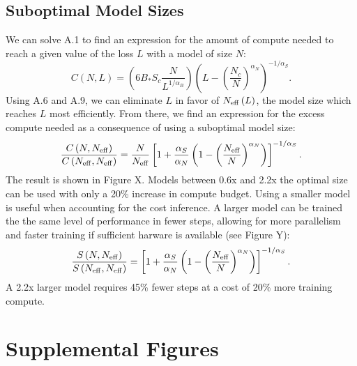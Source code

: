 \documentclass[english]{article}
\newcommand{\be}{\begin{equation}}
\newcommand{\ee}{\end{equation}}
\begin{document}
\subsection{Suboptimal Model Sizes}
\label{sec:suboptimal-models}
We can solve A.1 to find an expression for the amount of compute needed to reach a given value of the loss $L$ with a model of size $N$:
\be
C\left(N,L\right)=\left(6B_{\ast}S_{c}\frac{N}{L^{1/\alpha_{B}}}\right)\left(L-\left(\frac{N_{c}}{N}\right)^{\alpha_{N}}\right)^{-1/\alpha_{S}}.
\ee
Using A.6 and A.9, we can eliminate $L$ in favor of $N_{{\rm eff}}\left(L\right)$, the model size which reaches $L$ most efficiently. From there, we find an expression for the excess compute needed as a consequence of using a suboptimal model size: 
\be
\frac{C\left(N,N_{{\rm eff}}\right)}{C\left(N_{{\rm eff}},N_{{\rm eff}}\right)}=\frac{N}{N_{{\rm eff}}}\left[1+\frac{\alpha_{S}}{\alpha_{N}}\left(1-\left(\frac{N_{{\rm eff}}}{N}\right)^{\alpha_{N}}\right)\right]^{-1/\alpha_{S}}.
\ee
The result is shown in Figure X. Models between 0.6x and 2.2x the optimal size can be used with only a 20\% increase in compute budget. Using a smaller model is useful when accounting for the cost inference. A larger model can be trained the the same level of performance in fewer steps, allowing for more parallelism and faster training if sufficient harware is available (see Figure Y):
\be
\frac{S\left(N,N_{{\rm eff}}\right)}{S\left(N_{{\rm eff}},N_{{\rm eff}}\right)}=\left[1+\frac{\alpha_{S}}{\alpha_{N}}\left(1-\left(\frac{N_{{\rm eff}}}{N}\right)^{\alpha_{N}}\right)\right]^{-1/\alpha_{S}}.
\ee
A 2.2x larger model requires 45\% fewer steps at a cost of 20\% more training compute.

\section{Supplemental  Figures}
\end{document}
